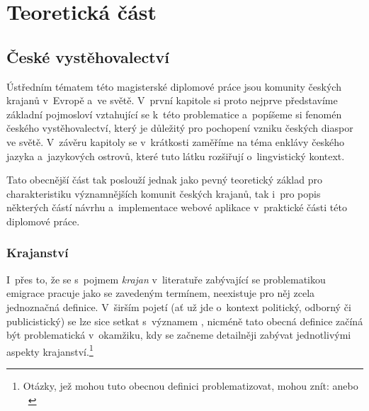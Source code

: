 \part{Teoretická část}

\hypertarget{ux10deskuxe9-vystux11bhovalectvuxed}{%
\chapter{České vystěhovalectví}\label{ux10deskuxe9-vystux11bhovalectvuxed}}

Ústředním tématem této magisterské diplomové práce jsou komunity českých krajanů v~Evropě a~ve světě. V~první kapitole si proto nejprve představíme základní pojmosloví vztahující se k~této problematice a~popíšeme si fenomén českého vystěhovalectví, který je důležitý pro pochopení vzniku českých diaspor ve světě. V~závěru kapitoly se v~krátkosti zaměříme na téma enklávy českého jazyka a~jazykových ostrovů, které tuto látku rozšiřují o~lingvistický kontext.

Tato obecnější část tak poslouží jednak jako pevný teoretický základ pro charakteristiku významnějších komunit českých krajanů, tak i~pro popis některých částí návrhu a~implementace webové aplikace v~praktické části této diplomové práce.

\hypertarget{krajanstvuxed}{%
\section{Krajanství}\label{krajanstvuxed}}

I~přes to, že se s~pojmem \emph{krajan} v~literatuře zabývající se problematikou emigrace pracuje jako se zavedeným termínem, neexistuje pro něj zcela jednoznačná definice. V~širším pojetí (ať už jde o~kontext politický, odborný či publicistický) se lze sice setkat s~významem , nicméně tato obecná definice začíná být problematická v~okamžiku, kdy se začneme detailněji zabývat jednotlivými aspekty krajanství.\footnote{Otázky, jež mohou tuto obecnou definici problematizovat, mohou znít:  anebo ~\parencite{Jakoubek2015}}~\parencite{Jakoubek2015}

